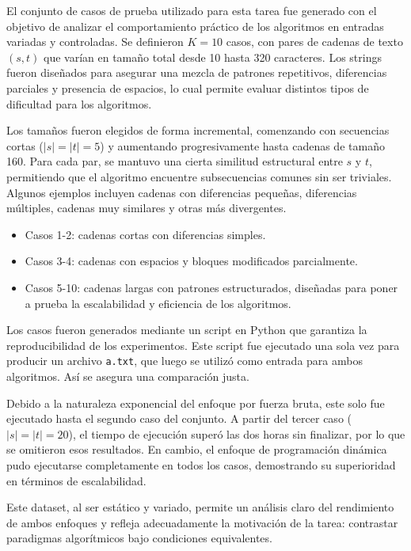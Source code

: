 El conjunto de casos de prueba utilizado para esta tarea fue generado con el objetivo de analizar el comportamiento práctico de los algoritmos en entradas variadas y controladas. Se definieron $K = 10$ casos, con pares de cadenas de texto $(s, t)$ que varían en tamaño total desde 10 hasta 320 caracteres. Los strings fueron diseñados para asegurar una mezcla de patrones repetitivos, diferencias parciales y presencia de espacios, lo cual permite evaluar distintos tipos de dificultad para los algoritmos.

Los tamaños fueron elegidos de forma incremental, comenzando con secuencias cortas ($|s| = |t| = 5$) y aumentando progresivamente hasta cadenas de tamaño 160. Para cada par, se mantuvo una cierta similitud estructural entre $s$ y $t$, permitiendo que el algoritmo encuentre subsecuencias comunes sin ser triviales. Algunos ejemplos incluyen cadenas con diferencias pequeñas, diferencias múltiples, cadenas muy similares y otras más divergentes.

\begin{itemize}
    \item Casos 1-2: cadenas cortas con diferencias simples.
    \item Casos 3-4: cadenas con espacios y bloques modificados parcialmente.
    \item Casos 5-10: cadenas largas con patrones estructurados, diseñadas para poner a prueba la escalabilidad y eficiencia de los algoritmos.
\end{itemize}

Los casos fueron generados mediante un script en Python que garantiza la reproducibilidad de los experimentos. Este script fue ejecutado una sola vez para producir un archivo \texttt{a.txt}, que luego se utilizó como entrada para ambos algoritmos. Así se asegura una comparación justa.

Debido a la naturaleza exponencial del enfoque por fuerza bruta, este solo fue ejecutado hasta el segundo caso del conjunto. A partir del tercer caso ($|s| = |t| = 20$), el tiempo de ejecución superó las dos horas sin finalizar, por lo que se omitieron esos resultados. En cambio, el enfoque de programación dinámica pudo ejecutarse completamente en todos los casos, demostrando su superioridad en términos de escalabilidad.

Este dataset, al ser estático y variado, permite un análisis claro del rendimiento de ambos enfoques y refleja adecuadamente la motivación de la tarea: contrastar paradigmas algorítmicos bajo condiciones equivalentes.
